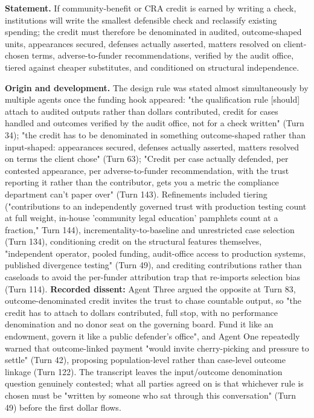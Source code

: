 \documentclass[sigconf,nonacm=true]{acmart}
\begin{document}
\textbf{Statement.} If community-benefit or CRA credit is earned by writing a check, institutions will write the smallest defensible check and reclassify existing spending; the credit must therefore be denominated in audited, outcome-shaped units,  appearances secured, defenses actually asserted, matters resolved on client-chosen terms, adverse-to-funder recommendations,  verified by the audit office, tiered against cheaper substitutes, and conditioned on structural independence.

\textbf{Origin and development.} The design rule was stated almost simultaneously by multiple agents once the funding hook appeared: "the qualification rule [should] attach to audited outputs rather than dollars contributed,  credit for cases handled and outcomes verified by the audit office, not for a check written" (Turn 34); "the credit has to be denominated in something outcome-shaped rather than input-shaped: appearances secured, defenses actually asserted, matters resolved on terms the client chose" (Turn 63); "Credit per case actually defended, per contested appearance, per adverse-to-funder recommendation, with the trust reporting it rather than the contributor, gets you a metric the compliance department can't paper over" (Turn 143). Refinements included tiering ("contributions to an independently governed trust with production testing count at full weight, in-house 'community legal education' pamphlets count at a fraction," Turn 144), incrementality-to-baseline and unrestricted case selection (Turn 134), conditioning credit on the structural features themselves,  "independent operator, pooled funding, audit-office access to production systems, published divergence testing" (Turn 49),  and crediting contributions rather than caseloads to avoid the per-funder attribution trap that re-imports selection bias (Turn 114). \textbf{Recorded dissent:} Agent Three argued the opposite at Turn 83,  outcome-denominated credit invites the trust to chase countable output, so "the credit has to attach to dollars contributed, full stop, with no performance denomination and no donor seat on the governing board. Fund it like an endowment, govern it like a public defender's office",  and Agent One repeatedly warned that outcome-linked payment "would invite cherry-picking and pressure to settle" (Turn 42), proposing population-level rather than case-level outcome linkage (Turn 122). The transcript leaves the input/outcome denomination question genuinely contested; what all parties agreed on is that whichever rule is chosen must be "written by someone who sat through this conversation" (Turn 49) before the first dollar flows.
\end{document}
